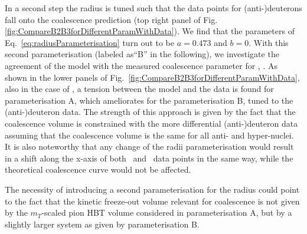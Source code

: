 In a second step the radius is tuned such that the data points for (anti-)deuterons fall onto the coalescence prediction (top right panel of Fig. \ref{fig:CompareB2B3forDifferentParamWithData}). We find that the parameters of Eq.~\ref{eq:radiusParameterisation} turn out to be $a = 0.473$ and $b = 0$. 
With this second parameterisation (labeled as``B'' in the following), we investigate the agreement of the model with the measured coalescence parameter for \hethree, \bthree. As shown in the lower panels of Fig.~\ref{fig:CompareB2B3forDifferentParamWithData}, also in the case of \bthree, a tension between the model and the data is found for parameterisation A, which ameliorates for the parameterisation B, tuned to the (anti-)deuteron data. The strength of this approach is given by the fact that the coalescence volume is constrained with the more differential (anti-)deuteron data assuming that the coalescence volume is the same for all anti- and hyper-nuclei. It is also noteworthy that any change of the radii parameterisation would result in a shift along the x-axis of both \btwo~and \bthree~data points in the same way, while the theoretical coalescence curve would not be affected. 

The necessity of introducing a second parameterisation for the radius could point to the fact that the kinetic freeze-out volume relevant for coalescence is not given by the $m_{T}$-scaled pion HBT volume considered in parameterisation A, but by a slightly larger system as given by parameterisation B.  

